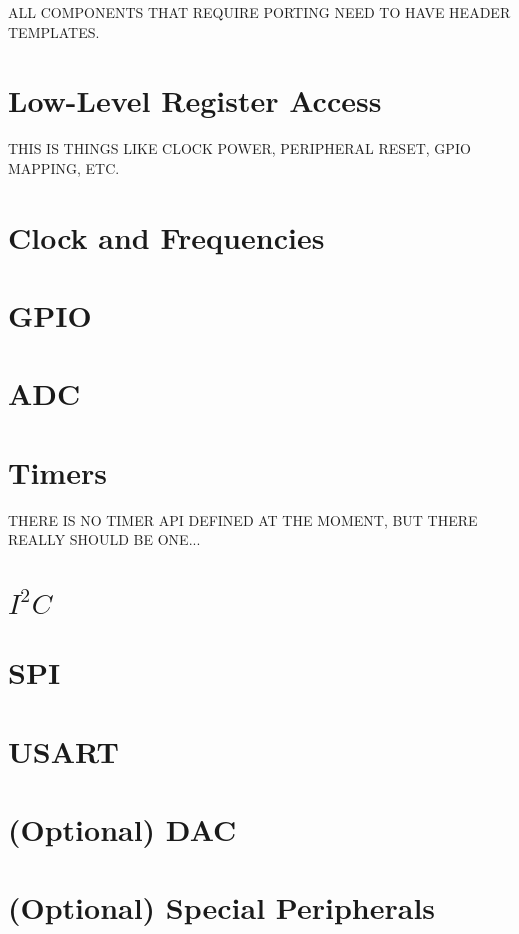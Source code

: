 \documentclass[12pt,letterpaper,article]{memoir} %
\begin{document}
ALL COMPONENTS THAT REQUIRE PORTING NEED TO HAVE HEADER TEMPLATES.
\section{Low-Level Register Access}
THIS IS THINGS LIKE CLOCK POWER, PERIPHERAL RESET, GPIO MAPPING, ETC.
\section{Clock and Frequencies}
\section{GPIO}
\section{ADC}
\section{Timers}
THERE IS NO TIMER API DEFINED AT THE MOMENT, BUT THERE REALLY SHOULD BE ONE...
\section{$I^2C$}
\section{SPI}
\section{USART}

\section{(Optional) DAC}
\section{(Optional) Special Peripherals}
\end{document}
